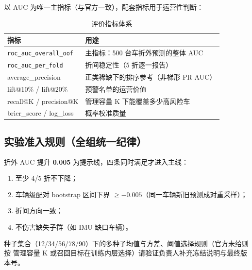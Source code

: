 以 AUC 为唯一主指标（与官方一致），配套指标用于运营性判断：

\begin{table}[H]
\centering
\caption{评价指标体系}
\label{tab:metrics}
\small
\begin{tabularx}{\textwidth}{lL}
\toprule
指标 & 用途 \\
\midrule
\texttt{roc\_auc\_overall\_oof} & 主指标：500 台车折外预测的整体 AUC \\
\texttt{roc\_auc\_per\_fold} & 折间稳定性（5 折逐一报告） \\
average\_precision & 正类稀缺下的排序参考（非梯形 PR AUC） \\
lift@10\% / lift@20\% & 预警名单的运营价值 \\
recall@K / precision@K & 管理容量 K 下能覆盖多少高风险车 \\
brier\_score / log\_loss & 概率校准质量 \\
\bottomrule
\end{tabularx}
\end{table}

\subsection{实验准入规则（全组统一纪律）}

折外 AUC 提升 \textbf{0.005} 为提示线，四条同时满足才进入主线：
\begin{enumerate}[label=(\arabic*)]
  \item 至少 4/5 折不下降；
  \item 车辆级配对 bootstrap 区间下界 $\ge -0.005$（同一车辆新旧预测成对重采样）；
  \item 折间方向一致；
  \item 不伤害缺失子群（如 IMU 缺口车辆）。
\end{enumerate}

\begin{TODO}
种子集合（12/34/56/78/90）下的多种子均值与方差、阈值选择规则（官方未给则按
管理容量 K 或召回目标在训练内层选择）请验证负责人补充冻结说明与最终版本号。
\end{TODO}
